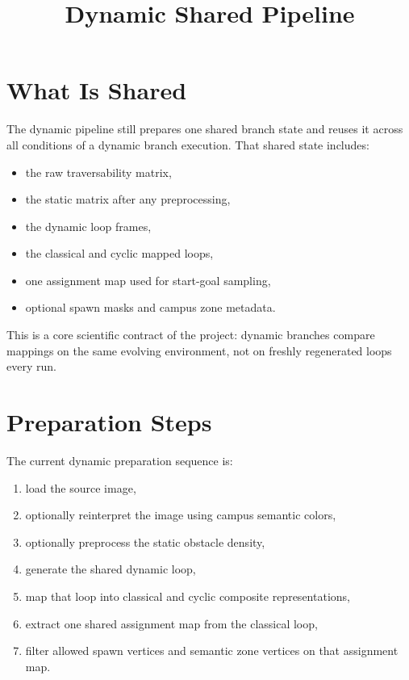 \documentclass[11pt]{article}
\title{Dynamic Shared Pipeline}
\author{}
\date{}
\begin{document}
\maketitle

\section{What Is Shared}

The dynamic pipeline still prepares one shared branch state and reuses it across all conditions of a dynamic branch execution. That shared state includes:
\begin{itemize}[leftmargin=2em]
    \item the raw traversability matrix,
    \item the static matrix after any preprocessing,
    \item the dynamic loop frames,
    \item the classical and cyclic mapped loops,
    \item one assignment map used for start-goal sampling,
    \item optional spawn masks and campus zone metadata.
\end{itemize}

This is a core scientific contract of the project: dynamic branches compare mappings on the same evolving environment, not on freshly regenerated loops every run.

\section{Preparation Steps}

The current dynamic preparation sequence is:
\begin{enumerate}[leftmargin=2em]
    \item load the source image,
    \item optionally reinterpret the image using campus semantic colors,
    \item optionally preprocess the static obstacle density,
    \item generate the shared dynamic loop,
    \item map that loop into classical and cyclic composite representations,
    \item extract one shared assignment map from the classical loop,
    \item filter allowed spawn vertices and semantic zone vertices on that assignment map.
\end{enumerate}
\end{document}
